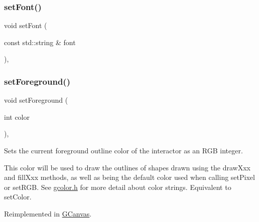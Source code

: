 \mbox{\label{classGForwardDrawingSurface_ab39ef411fb13a52852ddd138c5932e2e}} 
\subsubsection{\texorpdfstring{set\+Font()}{setFont()}\hspace{0.1cm}{\footnotesize\ttfamily [2/2]}}
{\footnotesize\ttfamily void set\+Font (\begin{DoxyParamCaption}\item[{const std\+::string \&}]{font }\end{DoxyParamCaption})\hspace{0.3cm}{\ttfamily [virtual]}, {\ttfamily [inherited]}}

\mbox{\label{classGDrawingSurface_a7daa57084b5811b598fce8726660b328}} 
\subsubsection{\texorpdfstring{set\+Foreground()}{setForeground()}\hspace{0.1cm}{\footnotesize\ttfamily [1/2]}}
{\footnotesize\ttfamily void set\+Foreground (\begin{DoxyParamCaption}\item[{int}]{color }\end{DoxyParamCaption})\hspace{0.3cm}{\ttfamily [virtual]}, {\ttfamily [inherited]}}



Sets the current foreground outline color of the interactor as an R\+GB integer. 

This color will be used to draw the outlines of shapes drawn using the draw\+Xxx and fill\+Xxx methods, as well as being the default color used when calling set\+Pixel or set\+R\+GB. See \mbox{\hyperlink{gcolor_8h_source}{gcolor.\+h}} for more detail about color strings. Equivalent to set\+Color. 

Reimplemented in \mbox{\hyperlink{classGCanvas_af9227e80cbfac55ce936fa5c99ffc954}{G\+Canvas}}.

\mbox{\label{classGDrawingSurface_af59209aeadea6dfc6d97a2d8531f50e1}} 
